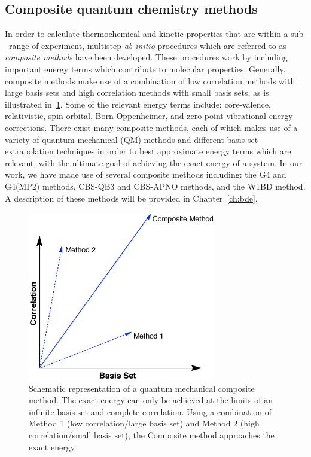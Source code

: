 \subsection{Composite quantum chemistry methods}

In order to calculate thermochemical and kinetic properties that are within a sub-\kcalmol\ range of experiment, multistep \emph{ab initio} procedures which are referred to as \emph{composite methods} have been developed.\cite{Karton2016} These procedures work by including important energy terms which contribute to molecular properties. Generally, composite methods make use of a combination of low correlation methods with large basis sets and high correlation methods with small basis sets, as is illustrated in~\ref{fig:comp}. Some of the relevant energy terms include: core-valence, relativistic, spin-orbital, Born-Oppenheimer, and zero-point vibrational energy corrections. There exist many composite methods, each of which makes use of a variety of quantum mechanical (QM) methods and different basis set extrapolation techniques in order to best approximate energy terms which are relevant, with the ultimate goal of achieving the exact energy of a system. In our work, we have made use of several composite methods including: the G4 and G4(MP2) methods,\cite{Curtiss2007,Curtiss2007a} CBS-QB3 and CBS-APNO methods,\cite{Montgomery1999,Montgomery2000,Ochterski1996} and the W1BD method.\cite{Barnes2009} A description of these methods will be provided in Chapter~\ref{ch:bde}.

\begin{figure}[htb]
  \centering
  \includegraphics[height=20em]{figures/compositemethods.eps}
  \caption[Schematic representation of a quantum mechanical composite method.]{Schematic representation of a quantum mechanical composite method. The exact energy can only be achieved at the limits of an infinite basis set and complete correlation. Using a combination of Method 1 (low correlation/large basis set) and Method 2 (high correlation/small basis set), the Composite method approaches the exact energy.}
\label{fig:comp}
\end{figure}


